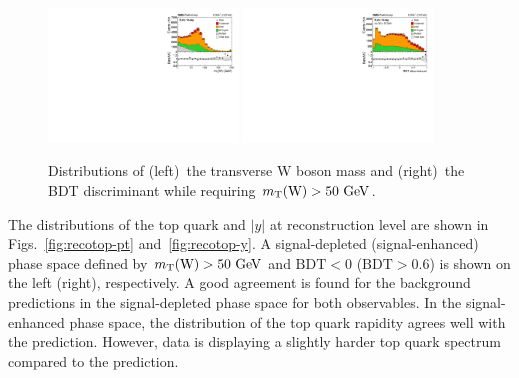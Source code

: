 \documentclass[12pt]{article}
\begin{document}
\begin{figure}[!htbp]
\begin{center}
\includegraphics[width=0.45\textwidth]{reco_mtw.pdf}\hspace{0.05\textwidth}
\includegraphics[width=0.45\textwidth]{reco_BDT.pdf}
\end{center}

\caption{\label{fig:mtwbdt}Distributions of (left)~the transverse W boson mass and (right)~the BDT discriminant while requiring $m_{\mathrm{T}}(\mathrm{W})>50~\mathrm{GeV}$.}
\end{figure}

The distributions of the top quark \pt and $|y|$ at reconstruction level are shown in Figs.~\ref{fig:recotop-pt} and~\ref{fig:recotop-y}. A signal-depleted (signal-enhanced) phase space defined by $m_{\mathrm{T}}(\mathrm{W})>50~\mathrm{GeV}$ and $\mathrm{BDT}<0$ ($\mathrm{BDT}>0.6$) is shown on the left (right), respectively. A good agreement is found for the background predictions in the signal-depleted phase space for both observables. In the signal-enhanced phase space, the distribution of the top quark rapidity agrees well with the prediction. However, data is displaying a slightly harder top quark \pt spectrum compared to the prediction.
\end{document}
